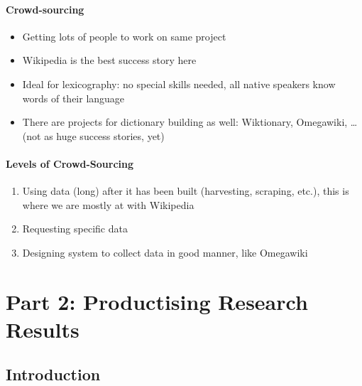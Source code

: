 \documentclass[t,12pt]{beamer}
\begin{document}
\begin{frame}
    \frametitle{Crowd-sourcing}
    \begin{itemize}
        \item Getting lots of people to work on same project
        \item Wikipedia is the best success story here
        \item Ideal for lexicography: no special skills needed, all native
            speakers know words of their language
        \item There are projects for dictionary building as well:
            Wiktionary, Omegawiki, \ldots (not as huge success stories, yet)
    \end{itemize}
\end{frame}

\begin{frame}
    \frametitle{Levels of Crowd-Sourcing}
    \begin{enumerate}
        \item Using data (long) after it has been built (harvesting, scraping,
            etc.), this is where we are mostly at with Wikipedia
        \item Requesting specific data 
        \item Designing system to collect data in good manner, like Omegawiki
    \end{enumerate}
\end{frame}

\chapter{Part 2: Productising Research Results}

\section{Introduction}

\begin{frame}
    \frametitle{}
\end{frame}
\end{document}
